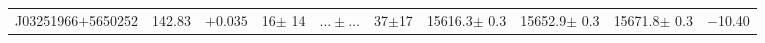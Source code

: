 \documentclass[printer]{aa} %
\begin{document}
\begin{landscape}
\begin{longtable}{cccccccccc}
J03251966$+$5650252 & 142.83 & $ +0.035$ &  16$\pm$ 14 & $\ldots\pm\ldots$ & 37$\pm$17 & 15616.3$\pm$  0.3 & 15652.9$\pm$  0.3 & 15671.8$\pm$  0.3 & $-$10.40\\

\end{longtable}
\end{landscape}
\end{document}
